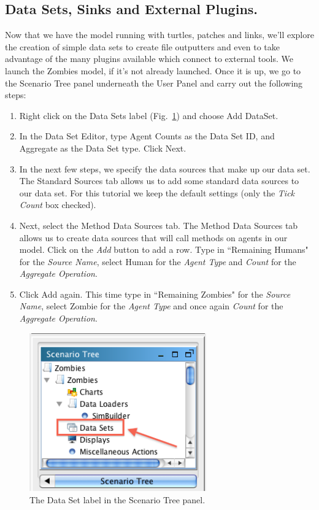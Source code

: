 \documentclass[11pt]{amsart}
\begin{document}
\clearpage

\subsection{Data Sets, Sinks and External Plugins.}
Now that we have the model running with turtles, patches and links, we'll explore the creation of simple data sets to create file outputters and even to take advantage of the many plugins available which connect to external tools.
We launch the Zombies model, if it's not already launched. Once it is up, we go to the Scenario Tree panel underneath the User Panel and carry out the following steps:
\begin{enumerate}
\item
Right click on the Data Sets label (Fig.~\ref{fig:datasetscenario}) and choose Add DataSet.
\item
In the Data Set Editor, type Agent Counts as the Data Set ID, and Aggregate as the Data Set type. Click Next.
\item
In the next few steps, we specify the data sources that make up our data set. The Standard Sources tab allows us to add some standard data sources to our data set. For this tutorial we keep the default settings (only the \emph{Tick Count} box checked).
\item
Next, select the Method Data Sources tab. The Method Data Sources tab allows us to create data sources that will call methods on agents in our model. Click on the \emph{Add} button to add a row. Type in ``Remaining Humans" for the \emph{Source Name}, select Human for the \emph{Agent Type} and \emph{Count} for the \emph{Aggregate Operation}.
\item\label{it:toRepeat}
Click Add again. This time type in ``Remaining Zombies" for the \emph{Source Name}, select Zombie for the \emph{Agent Type} and once again \emph{Count} for the \emph{Aggregate Operation}.
\end{enumerate}
\begin{figure}
\begin{center}
\vspace{.2in}
\centerline {
\includegraphics[width=3in]{GettingStartedImages/DataSetScenario.png}
}
\caption{The Data Set label in the Scenario Tree panel.}
\label{fig:datasetscenario}
\end{center}
\end{figure}
\end{document}
